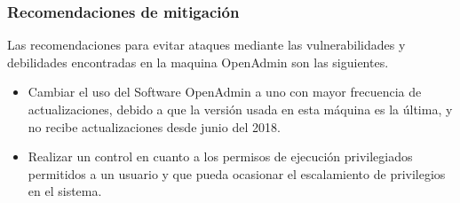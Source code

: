 \subsubsection{Recomendaciones de mitigación}
Las recomendaciones para evitar ataques mediante las vulnerabilidades y debilidades encontradas en la maquina OpenAdmin son las siguientes.
\begin{itemize}
    \item Cambiar el uso del Software OpenAdmin a uno con mayor frecuencia de actualizaciones, debido a que la versión usada en esta máquina es la última, y no recibe actualizaciones desde junio del 2018.
    \item Realizar un control en cuanto a los permisos de ejecución privilegiados permitidos a un usuario y que pueda ocasionar el escalamiento de privilegios en el sistema.
\end{itemize}